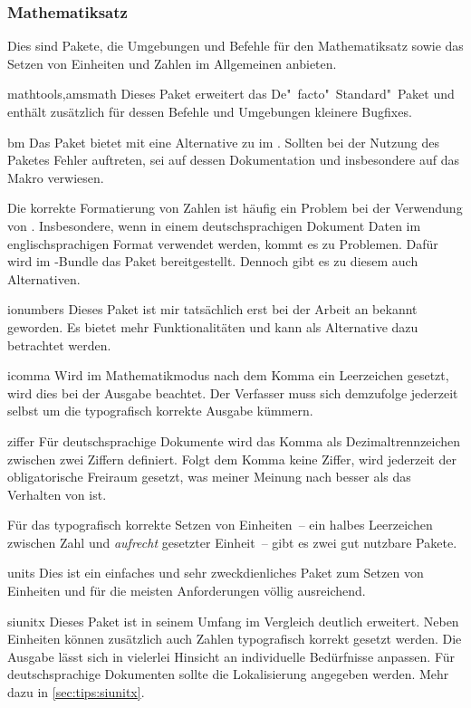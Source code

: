 \subsubsection{Mathematiksatz}
%
Dies sind Pakete, die Umgebungen und Befehle für den Mathematiksatz sowie das 
Setzen von Einheiten und Zahlen im Allgemeinen anbieten.

\begin{packages}
\item[mathtools,amsmath]
  Dieses Paket erweitert das De"~facto"~Standard"~Paket  und 
  enthält zusätzlich für dessen Befehle und Umgebungen kleinere Bugfixes.
\item[bm]
  Das Paket bietet mit  eine Alternative zu  im 
  . Sollten bei
  der Nutzung des Paketes Fehler auftreten, sei auf dessen Dokumentation und 
  insbesondere auf das Makro  verwiesen.
\end{packages}
%
Die korrekte Formatierung von Zahlen ist häufig ein Problem bei der Verwendung 
von . Insbesondere, wenn in einem deutschsprachigen Dokument 
Daten im englischsprachigen Format verwendet werden, kommt es zu Problemen. 
Dafür wird im \TUDScript-Bundle das Paket  bereitgestellt. 
Dennoch gibt es zu diesem auch Alternativen.
%
\begin{packages}
%
\item[ionumbers]
  Dieses Paket ist mir tatsächlich erst bei der Arbeit an  
  bekannt geworden. Es bietet mehr Funktionalitäten und kann als Alternative 
  dazu betrachtet werden.
\item[icomma]
  Wird im Mathematikmodus nach dem Komma ein Leerzeichen gesetzt, wird dies 
  bei der Ausgabe beachtet. Der Verfasser muss sich demzufolge jederzeit 
  selbst um die typografisch korrekte Ausgabe kümmern.
\item[ziffer]
  Für deutschsprachige Dokumente wird das Komma als Dezimaltrennzeichen 
  zwischen zwei Ziffern definiert. Folgt dem Komma keine Ziffer, wird 
  jederzeit der obligatorische Freiraum gesetzt, was meiner Meinung nach 
  besser als das Verhalten von  ist.
%
\end{packages}
%
Für das typografisch korrekte Setzen von Einheiten~-- ein halbes Leerzeichen 
zwischen Zahl und \emph{aufrecht} gesetzter Einheit~-- gibt es zwei gut 
nutzbare Pakete.
%
\begin{packages}
%
\item[units]
  Dies ist ein einfaches und sehr zweckdienliches Paket zum Setzen von 
  Einheiten und für die meisten Anforderungen völlig ausreichend.
\item[siunitx]
  Dieses Paket ist in seinem Umfang im Vergleich deutlich erweitert. Neben 
  Einheiten können zusätzlich auch Zahlen typografisch korrekt gesetzt werden. 
  Die Ausgabe lässt sich in vielerlei Hinsicht an individuelle Bedürfnisse 
  anpassen. Für deutschsprachige Dokumenten sollte die Lokalisierung angegeben 
  werden. Mehr dazu in \autoref{sec:tips:siunitx}.
%
\end{packages}
